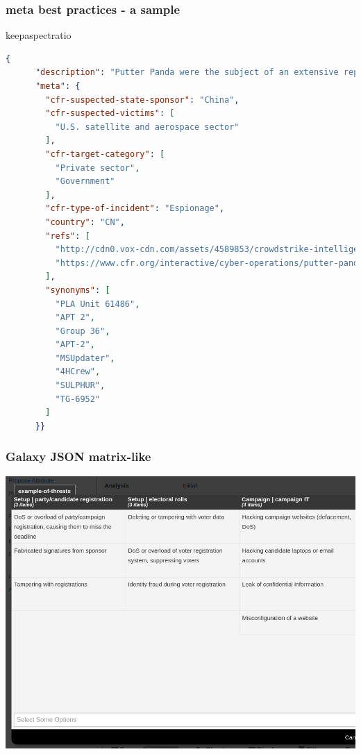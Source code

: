 \begin{frame}[fragile]
        \frametitle{meta best practices - a sample}
        \begin{adjustbox}{keepaspectratio}
          \begin{lstlisting}[language=json,firstnumber=1]
 {
      "description": "Putter Panda were the subject of an extensive report by CrowdStrike, which stated: 'The CrowdStrike Intelligence team has been tracking this particular unit since2012, under the codename PUTTER PANDA, and has documented activity dating back to 2007. The report identifies Chen Ping, aka cpyy, and the primary location of Unit 61486.'",
      "meta": {
        "cfr-suspected-state-sponsor": "China",
        "cfr-suspected-victims": [
          "U.S. satellite and aerospace sector"
        ],
        "cfr-target-category": [
          "Private sector",
          "Government"
        ],
        "cfr-type-of-incident": "Espionage",
        "country": "CN",
        "refs": [
          "http://cdn0.vox-cdn.com/assets/4589853/crowdstrike-intelligence-report-putter-panda.original.pdf",
          "https://www.cfr.org/interactive/cyber-operations/putter-panda"
        ],
        "synonyms": [
          "PLA Unit 61486",
          "APT 2",
          "Group 36",
          "APT-2",
          "MSUpdater",
          "4HCrew",
          "SULPHUR",
          "TG-6952"
        ]
      }}
          \end{lstlisting}
          \end{adjustbox}
\end{frame}

\begin{frame}[fragile]
        \frametitle{Galaxy JSON matrix-like}
        \includegraphics[width=0.9\linewidth]{screenshots/galaxy-matrix.png}
\end{frame}

